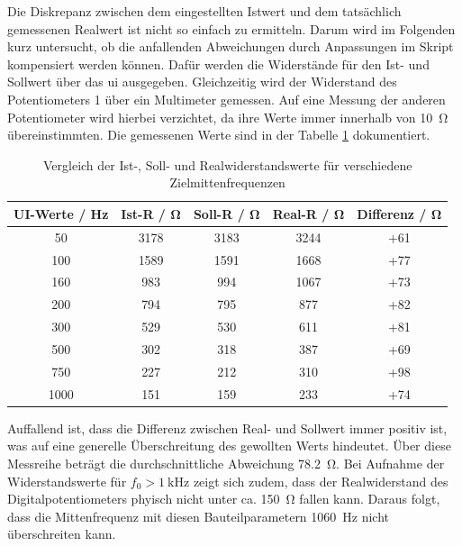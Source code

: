 \documentclass[../main_config.tex]{subfiles}
\begin{document}
Die Diskrepanz zwischen dem eingestellten Istwert und dem tatsächlich gemessenen Realwert ist nicht so einfach zu ermitteln. Darum wird im Folgenden kurz untersucht, ob die anfallenden Abweichungen durch Anpassungen im Skript kompensiert werden können. Dafür werden die Widerstände für den Ist- und Sollwert über das \gls{ui} ausgegeben. Gleichzeitig wird der Widerstand des Potentiometers \num{1} über ein Multimeter gemessen. Auf eine Messung der anderen Potentiometer wird hierbei verzichtet, da ihre Werte immer innerhalb von \SI{10}{\ohm} übereinstimmten. Die gemessenen Werte sind in der Tabelle \ref{tab:digipot_r_val} dokumentiert.

\begin{table}[h]
    \centering
    \begin{tabular}{c|c|c|c|c}
        \textbf{UI-Werte / \si{\hertz}} & \textbf{Ist-R / \si{\ohm}} & \textbf{Soll-R / \si{\ohm}} & \textbf{Real-R / \si{\ohm}} & \textbf{Differenz / \si{\ohm}} \\ \hline
        50 & 3178 & 3183 & 3244 & +61 \\
        100 & 1589 & 1591 & 1668 & +77 \\
        160 & 983 & 994 & 1067 & +73 \\
        200 & 794 & 795 & 877 & +82 \\
        300 & 529 & 530 & 611 & +81 \\
        500 & 302 & 318 & 387 & +69 \\
        750 & 227 & 212 & 310 & +98 \\
        1000 & 151 & 159 & 233 & +74 \\ 
    \end{tabular}
    \caption{Vergleich der Ist-, Soll- und Realwiderstandswerte für verschiedene Zielmittenfrequenzen}
    \label{tab:digipot_r_val}
\end{table}

Auffallend ist, dass die Differenz zwischen Real- und Sollwert immer positiv ist, was auf eine generelle Überschreitung des gewollten Werts hindeutet. Über diese Messreihe beträgt die durchschnittliche Abweichung \SI{78,2}{\ohm}. Bei Aufnahme der Widerstandswerte für $f_0 > \SI{1}{\kilo\hertz}$ zeigt sich zudem, dass der Realwiderstand des Digitalpotentiometers phyisch nicht unter ca. \SI{150}{\ohm} fallen kann. Daraus folgt, dass die Mittenfrequenz mit diesen Bauteilparametern \SI{1060}{\hertz} nicht überschreiten kann. \par
\medskip
\end{document}
